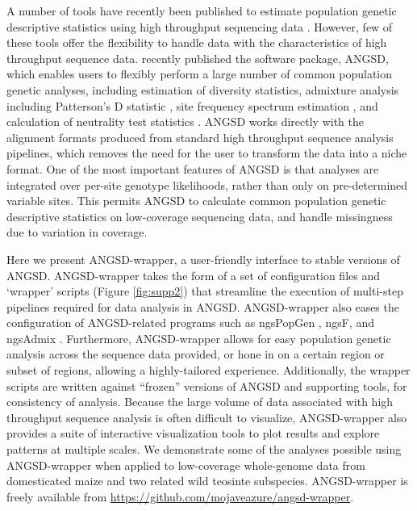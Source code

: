 \documentclass[10pt,a4paper]{article}
\newcommand{\ph}[1]{\todo[size=\scriptsize, color=pink]{#1}}
\begin{document}
A number of tools have recently been published to estimate population genetic descriptive statistics using high throughput sequencing data \citep{garrigan2013popbam, purcell2007plink, danecek2011variant, hutter2006genome}. 
However, few of these tools offer the flexibility to handle data with the characteristics of high throughput sequence data. 
\citet{korneliussen2014angsd} recently published the software package, ANGSD, which enables users to flexibly perform a large number of common population genetic analyses, including estimation of diversity statistics, admixture analysis including Patterson's D statistic \citep{Durand:2011jd}, site frequency spectrum estimation \citep{pmid22911679}, and calculation of neutrality test statistics \citep{korneliussen_calculation_2013}. 
ANGSD works directly with the alignment formats produced from standard high throughput sequence analysis pipelines, which removes the need for the user to transform the data into a niche format. 
One of the most important features of ANGSD is that analyses are integrated over per-site genotype likelihoods, rather than only on pre-determined variable sites. 
This permits ANGSD to calculate common population genetic descriptive statistics on low-coverage sequencing data, and handle missingness due to variation in coverage. 

Here we present ANGSD-wrapper, a user-friendly interface to stable versions of ANGSD. 
ANGSD-wrapper takes the form of a set of configuration files and `wrapper' scripts (Figure \ref{fig:supp2}) that streamline the execution of multi-step pipelines required for data analysis in ANGSD. 
ANGSD-wrapper also eases the configuration of ANGSD-related programs such as ngsPopGen \citep{ngsPopGen}, ngsF\citep{vieira2013estimating}, and ngsAdmix \citep{pmid24026093}. 
\ph{This could be reworded} Furthermore, ANGSD-wrapper allows for easy population genetic analysis across the sequence data provided, or hone in on a certain region or subset of regions, allowing a highly-tailored experience.
Additionally, the wrapper scripts are written against ``frozen'' versions of ANGSD and supporting tools, for consistency of analysis. 
Because the large volume of data associated with high throughput sequence analysis is often difficult to visualize, ANGSD-wrapper also provides a suite of interactive visualization tools to plot results and explore patterns at multiple scales.  
We demonstrate some of the analyses possible using ANGSD-wrapper when applied to low-coverage whole-genome data from domesticated maize and two related wild teosinte subspecies. 
ANGSD-wrapper is freely available from \url{https://github.com/mojaveazure/angsd-wrapper}.
\end{document}

